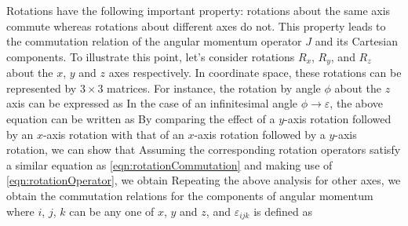 Rotations have the following important property:  rotations about the same axis commute whereas rotations about 
different axes do not.  This property leads to the commutation relation of the angular momentum operator $J$ and
its Cartesian components. 
To illustrate this point, let's consider rotations $R_x$, $R_y$, and $R_z$ about the $x$, $y$ and $z$ axes respectively. In 
coordinate space, these rotations can be represented by $3\times 3$ matrices. For instance, the rotation by angle $\phi$ about the $z$ axis can be expressed as
In the case of an infinitesimal angle $\phi\rightarrow\varepsilon$, the above equation can be written as
By comparing the effect of a $y$-axis rotation followed by an $x$-axis rotation with that of an $x$-axis rotation 
followed by a $y$-axis rotation, we can show that 
Assuming the corresponding rotation operators satisfy a similar equation as \autoref{eqn:rotationCommutation} and
making use of \autoref{eqn:rotationOperator}, we obtain
Repeating the above analysis for other axes, we obtain the commutation relations for the components of angular momentum
where $i$, $j$, $k$ can be any one of $x$, $y$ and $z$, and $ \varepsilon_{ijk}$ is defined as 

